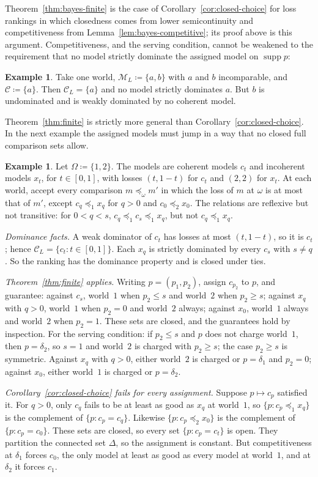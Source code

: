 \documentclass[11pt]{article}
\theoremstyle{definition}
\newtheorem{example}[theorem]{Example}
\theoremstyle{remark}
\newcommand{\M}{\mathcal M}
\newcommand{\C}{\mathcal C}
\newcommand{\supp}{\operatorname{supp}}
\begin{document}
Theorem~\ref{thm:bayes-finite} is the case of Corollary~\ref{cor:closed-choice} for loss rankings in which closedness comes from lower semicontinuity and competitiveness from Lemma~\ref{lem:bayes-competitive}; its proof above is this argument. Competitiveness, and the serving condition, cannot be weakened to the requirement that no model strictly dominate the assigned model on $\supp p$:

\begin{example}\label{ex:incomparable}
Take one world, $\M_L\coloneqq\{a,b\}$ with $a$ and $b$ incomparable, and $\C\coloneqq\{a\}$. Then $\C_L=\{a\}$ and no model strictly dominates $a$. But $b$ is undominated and is weakly dominated by no coherent model.
\end{example}

Theorem~\ref{thm:finite} is strictly more general than Corollary~\ref{cor:closed-choice}. In the next example the assigned models must jump in a way that no closed full comparison sets allow.

\begin{example}\label{ex:two-world}
Let $\Omega\coloneqq\{1,2\}$. The models are coherent models $c_t$ and incoherent models $x_t$, for $t\in[0,1]$, with losses $(t,1-t)$ for $c_t$ and $(2,2)$ for $x_t$. At each world, accept every comparison $m\preceq_\omega m'$ in which the loss of $m$ at $\omega$ is at most that of $m'$, except $c_q\preceq_1x_q$ for $q>0$ and $c_0\preceq_2x_0$. The relations are reflexive but not transitive: for $0<q<s$, $c_q\preceq_1c_s\preceq_1x_q$, but not $c_q\preceq_1x_q$.

\emph{Dominance facts.} A weak dominator of $c_t$ has losses at most $(t,1-t)$, so it is $c_t$; hence $\C_L=\{c_t:t\in[0,1]\}$. Each $x_q$ is strictly dominated by every $c_s$ with $s\ne q$. So the ranking has the dominance property and is closed under ties.

\emph{Theorem~\ref{thm:finite} applies.} Writing $p=(p_1,p_2)$, assign $c_{p_2}$ to $p$, and guarantee: against $c_s$, world~$1$ when $p_2\le s$ and world~$2$ when $p_2\ge s$; against $x_q$ with $q>0$, world~$1$ when $p_2=0$ and world~$2$ always; against $x_0$, world~$1$ always and world~$2$ when $p_2=1$. These sets are closed, and the guarantees hold by inspection. For the serving condition: if $p_2\le s$ and $p$ does not charge world~$1$, then $p=\delta_2$, so $s=1$ and world~$2$ is charged with $p_2\ge s$; the case $p_2\ge s$ is symmetric. Against $x_q$ with $q>0$, either world~$2$ is charged or $p=\delta_1$ and $p_2=0$; against $x_0$, either world~$1$ is charged or $p=\delta_2$.

\emph{Corollary~\ref{cor:closed-choice} fails for every assignment.} Suppose $p\mapsto c_p$ satisfied it. For $q>0$, only $c_q$ fails to be at least as good as $x_q$ at world~$1$, so $\{p:c_p\preceq_1x_q\}$ is the complement of $\{p:c_p=c_q\}$. Likewise $\{p:c_p\preceq_2x_0\}$ is the complement of $\{p:c_p=c_0\}$. These sets are closed, so every set $\{p:c_p=c_t\}$ is open. They partition the connected set $\Delta$, so the assignment is constant. But competitiveness at $\delta_1$ forces $c_0$, the only model at least as good as every model at world~$1$, and at $\delta_2$ it forces $c_1$.
\end{example}
\end{document}
